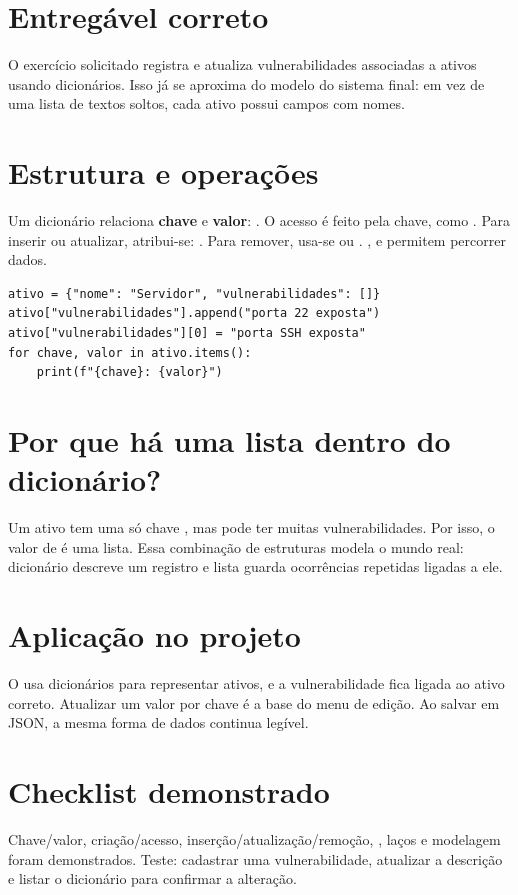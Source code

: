 \documentclass[11pt,a4paper]{article}
\begin{document}
\section*{Entregável correto}
O exercício solicitado registra e atualiza vulnerabilidades associadas a ativos usando dicionários. Isso já se aproxima do modelo do sistema final: em vez de uma lista de textos soltos, cada ativo possui campos com nomes.
\section*{Estrutura e operações}
Um dicionário relaciona \textbf{chave} e \textbf{valor}: . O acesso é feito pela chave, como . Para inserir ou atualizar, atribui-se: . Para remover, usa-se  ou . ,  e  permitem percorrer dados.
\begin{lstlisting}
ativo = {"nome": "Servidor", "vulnerabilidades": []}
ativo["vulnerabilidades"].append("porta 22 exposta")
ativo["vulnerabilidades"][0] = "porta SSH exposta"
for chave, valor in ativo.items():
    print(f"{chave}: {valor}")
\end{lstlisting}
\section*{Por que há uma lista dentro do dicionário?}
Um ativo tem uma só chave , mas pode ter muitas vulnerabilidades. Por isso, o valor de  é uma lista. Essa combinação de estruturas modela o mundo real: dicionário descreve um registro e lista guarda ocorrências repetidas ligadas a ele.
\section*{Aplicação no projeto}
O  usa dicionários para representar ativos, e a vulnerabilidade fica ligada ao ativo correto. Atualizar um valor por chave é a base do menu de edição. Ao salvar em JSON, a mesma forma de dados continua legível.
\section*{Checklist demonstrado}
Chave/valor, criação/acesso, inserção/atualização/remoção, , laços e modelagem foram demonstrados. Teste: cadastrar uma vulnerabilidade, atualizar a descrição e listar o dicionário para confirmar a alteração.
\end{document}
